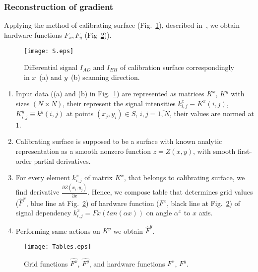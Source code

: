 \documentclass{beamer}
\begin{document}
\begin{frame}[c,allowframebreaks]
    \frametitle{Reconstruction of gradient}

    Applying the method of calibrating surface (Fig.~\ref{fig:inputSphere}), described in~\cite{main},
    we obtain hardware functions $F_x, F_y$ (Fig~\ref{fig:Tables})).

    \begin{figure}[hp]
        \texttt{[image: S.eps]}
        \caption{\small Differential signal $I_{AD}$ and $I_{EH}$ of calibration surface
            correspondingly in $x$~(a) and $y$~(b) scanning direction.}
        {\label{fig:inputSphere}}%
    \end{figure}

    \framebreak

    \begin{enumerate}
        \item Input data ((a) and (b) in Fig.~\ref{fig:inputSphere}) are represented as matrices
            $K^x$, $K^y$ with sizes $(N \times N)$, their represent the signal intensities
            $k^x_{i,j} \equiv K^x (i,j)$, $K^y_{i,j} \equiv k^y (i,j)$ at points $(x_j, y_i) \in S$,
            $i,j = \overline{1,N}$, their values are normed at $1$.

        \item Calibrating surface is supposed to be a surface with known analytic representation as
            a smooth nonzero function $z = Z (x, y)$, with smooth first-order partial derivatives.

        \item For every element $k^x_{i,j}$ of matrix $K^x$, that belongs to calibrating surface, we
            find derivative $\frac{\partial Z(x_i, y_j)}{\partial x}$. Hence, we compose table that
            determines grid values ($\hat{F}^x$, blue line at Fig.~\ref{fig:Tables}) of hardware
            function ($F^x$, black line at Fig.~\ref{fig:Tables}) of signal dependency $k^x_{i,j} =
            Fx(tan(\alpha x))$ on angle $\alpha^x$ to $x$ axis.

        \item Performing same actions on $K^y$ we obtain $\hat{F}^y$.

    \end{enumerate}

    \framebreak

    \begin{figure}
        \texttt{[image: Tables.eps]}
        \caption{Grid functions $\hat{F^x}$, $\hat{F^y}$, and hardware functions $F^x$, $F^y$.}
        {\label{fig:Tables}}%
    \end{figure}


\end{frame}
\end{document}
